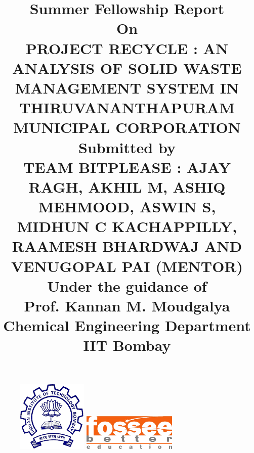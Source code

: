 \documentclass[12pt,a4paper]{report}
\begin{document}
\begin{figure}
	\centering
	\includegraphics[width = 0.3\textwidth]{iit}
	\hspace{1cm}
	\includegraphics[width = 0.4\textwidth]{fossee-logo}
\end{figure}

\title
	{\textbf
			{\textbf
				{Summer Fellowship Report}}
				\vspace{5mm} 
				\\\small On 
				\\\vspace{5mm} 
				\textbf
				{\large PROJECT RECYCLE : AN ANALYSIS OF SOLID WASTE MANAGEMENT SYSTEM IN THIRUVANANTHAPURAM MUNICIPAL CORPORATION}
				\vspace{5mm} 
				\\\vspace{5mm}
				\small Submitted by
				\\\vspace{5mm}  
				\large 
				\textbf
					{TEAM BITPLEASE :}
					\small AJAY RAGH, AKHIL M, ASHIQ MEHMOOD, ASWIN S, MIDHUN C KACHAPPILLY, RAAMESH BHARDWAJ AND VENUGOPAL PAI (MENTOR)	
					\\ \vspace{5mm}
				\small Under the guidance of \\ \vspace{5mm}
				\large 
				\textbf{Prof. Kannan M. Moudgalya} 
				\vspace{1mm}\\ Chemical Engineering Department  \vspace{1mm} \\IIT Bombay
}
\vspace{1cm}


\maketitle
\end{document}
